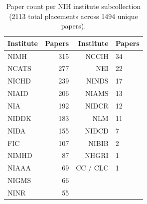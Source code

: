 \documentclass[11pt]{article}
\begin{document}
\begin{table}[h]
\centering
\begin{tabular}{lrr}
\toprule
Institute & Papers & Institute & Papers \\
\midrule
NIMH   & 315 & NCCIH    & 34 \\
NCATS  & 277 & NEI      & 22 \\
NICHD  & 239 & NINDS    & 17 \\
NIAID  & 206 & NIAMS    & 13 \\
NIA    & 192 & NIDCR    & 12 \\
NIDDK  & 183 & NLM      & 11 \\
NIDA   & 155 & NIDCD    & 7  \\
FIC    & 107 & NIBIB    & 2  \\
NIMHD  & 87  & NHGRI    & 1  \\
NIAAA  & 69  & CC / CLC & 1  \\
NIGMS  & 66  &          &    \\
NINR   & 55  &          &    \\
\bottomrule
\end{tabular}
\caption{Paper count per NIH institute subcollection (2113 total placements across 1494 unique papers).}
\end{table}
\end{document}
